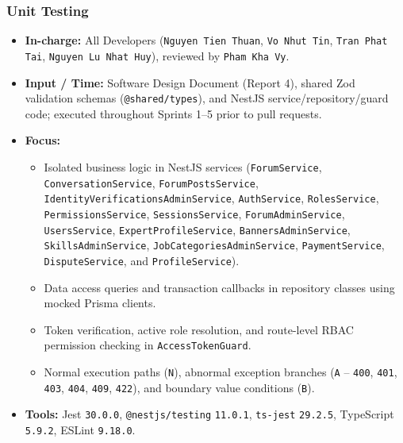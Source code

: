 \documentclass[12pt,a4paper]{article}
\begin{document}
\subsubsection{Unit Testing}
\begin{itemize}
  \item \textbf{In-charge:} All Developers (\texttt{Nguyen Tien Thuan}, \texttt{Vo Nhut Tin}, \texttt{Tran Phat Tai}, \texttt{Nguyen Lu Nhat Huy}), reviewed by \texttt{Pham Kha Vy}.
  \item {\sloppy \textbf{Input / Time:} Software Design Document (Report 4), shared Zod validation schemas (\texttt{@shared/\allowbreak{}types}), and NestJS service/\allowbreak{}repository/\allowbreak{}guard code; executed throughout Sprints 1--5 prior to pull requests.\par}
  \item \textbf{Focus:}
  \begin{itemize}
    \item {\sloppy Isolated business logic in NestJS services (\texttt{Forum\allowbreak Service}, \texttt{Conversation\allowbreak Service}, \texttt{Forum\allowbreak Posts\allowbreak Service}, \texttt{Identity\allowbreak Verifications\allowbreak Admin\allowbreak Service}, \texttt{Auth\allowbreak Service}, \texttt{Roles\allowbreak Service}, \texttt{Permissions\allowbreak Service}, \texttt{Sessions\allowbreak Service}, \texttt{Forum\allowbreak Admin\allowbreak Service}, \texttt{Users\allowbreak Service}, \texttt{Expert\allowbreak Profile\allowbreak Service}, \texttt{Banners\allowbreak Admin\allowbreak Service}, \texttt{Skills\allowbreak Admin\allowbreak Service}, \texttt{Job\allowbreak Categories\allowbreak Admin\allowbreak Service}, \texttt{Payment\allowbreak Service}, \texttt{Dispute\allowbreak Service}, and \texttt{Profile\allowbreak Service}).\par}
    \item Data access queries and transaction callbacks in repository classes using mocked Prisma clients.
    \item Token verification, active role resolution, and route-level RBAC permission checking in \texttt{AccessTokenGuard}.
    \item Normal execution paths (\texttt{N}), abnormal exception branches (\texttt{A} -- \texttt{400}, \texttt{401}, \texttt{403}, \texttt{404}, \texttt{409}, \texttt{422}), and boundary value conditions (\texttt{B}).
  \end{itemize}
  \item \textbf{Tools:} Jest \texttt{30.0.0}, \texttt{@nestjs/testing} \texttt{11.0.1}, \texttt{ts-jest} \texttt{29.2.5}, TypeScript \texttt{5.9.2}, ESLint \texttt{9.18.0}.

\end{itemize}
\end{document}
